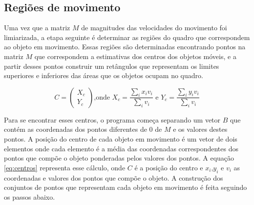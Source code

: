 \subsection{Regiões de movimento}\label{sec:sub:regioesmovimento}

Uma vez que a matriz $M$ de magnitudes das velocidades do movimento foi limiarizada, a etapa seguinte é determinar as regiões do quadro que correspondem ao objeto em movimento. Essas regiões são determinadas encontrando pontos na matriz $M$ que correspondem a estimativas dos centros dos objetos móveis, e a partir desses pontos construir um retângulos que representam os limites superiores e inferiores das áreas que os objetos ocupam no quadro.

\begin{equation}
C=\begin{pmatrix}
X_c\\Y_c
\end{pmatrix}
\text{,onde } 
X_c = \frac{\sum_i x_iv_i}{\sum_iv_i}
\text{ e }
Y_c = \frac{\sum_i y_iv_i}{\sum_iv_i}
\label{eq:centros}
\end{equation}

Para se encontrar esses centros, o programa começa separando um vetor $B$ que contém as coordenadas dos pontos diferentes de $0$ de $M$ e os valores destes pontos. A posição do centro de cada objeto em movimento é um vetor de dois elementos onde cada elemento é a média das coordenadas correspondentes dos pontos que compõe o objeto ponderadas pelos valores dos pontos. A equação \ref{eq:centros} representa esse cálculo, onde $C$ é a posição do centro e $x_i$,$y_i$ e $v_i$ as coordenadas e valores dos pontos que compõe o objeto. A construção dos conjuntos de pontos que representam cada objeto em movimento é feita seguindo os passos abaixo.

